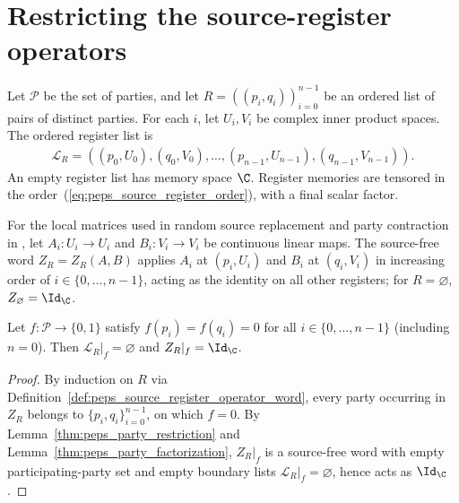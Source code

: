 \section{Restricting the source-register operators}
\label{sec:peps_source_register_operators}

Let $\mathcal P$ be the set of parties, and let
$R=((p_i,q_i))_{i=0}^{n-1}$ be an ordered list of pairs of distinct parties.
For each $i$, let $U_i,V_i$ be complex inner product spaces. The ordered
register list is
\begin{align}
    \mathcal L_R
    = ((p_0,U_0),(q_0,V_0),\ldots,(p_{n-1},U_{n-1}),(q_{n-1},V_{n-1})).
    \label{eq:peps_source_register_order}
\end{align}
An empty register list has memory space $\C$. Register memories are tensored
in the order~(\ref{eq:peps_source_register_order}), with a final scalar factor.

\begin{definition}
    \label{def:peps_source_register_operator_word}
    \leanok
    For the local matrices used in random source replacement and party
    contraction in \cite[proof of Theorem~5.2]{OpenAI2026PolynomialPEPS}, let
    $A_i:U_i\to U_i$ and $B_i:V_i\to V_i$ be continuous linear maps. The
    source-free word $Z_R=Z_R(A,B)$ applies $A_i$ at $(p_i,U_i)$ and $B_i$ at
    $(q_i,V_i)$ in increasing order of $i\in\{0,\ldots,n-1\}$, acting as the
    identity on all other registers; for $R=\varnothing$,
    $Z_{\varnothing}=\Id_{\C}$.
\end{definition}

\begin{lemma}
    \label{thm:peps_source_register_operator_exclusion}
    \leanok
    Let $f:\mathcal P\to\{0,1\}$ satisfy $f(p_i)=f(q_i)=0$ for all
    $i\in\{0,\ldots,n-1\}$ (including $n=0$). Then $\mathcal L_R|_f=\varnothing$
    and $Z_R|_f=\Id_{\C}$.
\end{lemma}

\begin{proof}\leanok
    By induction on $R$ via Definition~\ref{def:peps_source_register_operator_word},
    every party occurring in $Z_R$ belongs to $\{p_i,q_i\}_{i=0}^{n-1}$, on
    which $f=0$. By Lemma~\ref{thm:peps_party_restriction} and
    Lemma~\ref{thm:peps_party_factorization}, $Z_R|_f$ is a source-free word
    with empty participating-party set and empty boundary lists
    $\mathcal L_R|_f=\varnothing$, hence acts as $\Id_{\C}$.
\end{proof}

